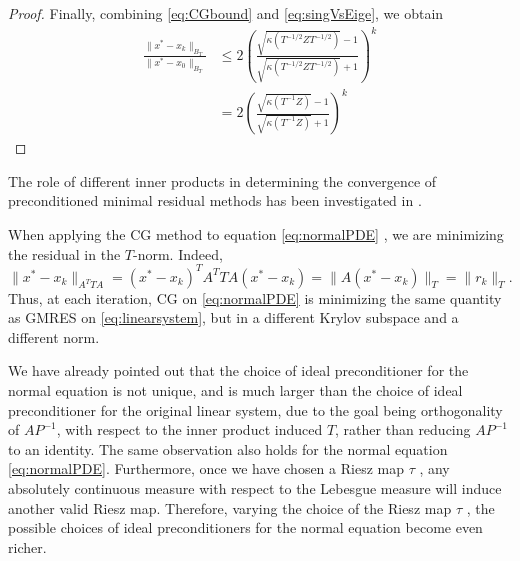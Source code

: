 \documentclass[hidelinks,onefignum,onetabnum]{siamart220329}
\newcommand{\bb}[1]{#1}
\let\vec\mathbf
\begin{document}
\begin{proof}
    Finally, combining \eqref{eq:CGbound} and \eqref{eq:singVsEige}, we obtain
    \begin{equation}
        \begin{aligned}
            \frac{\|x^* - x_k \|_{B_T}}{\|x^* - x_0 \|_{B_T}} & \leq 2\left( \frac{\sqrt{\kappa(T^{-1/2}ZT^{-1/2})} -1}{\sqrt{\kappa(T^{-1/2}ZT^{-1/2})} +1} \right)^k \\
                                                              & = 2\left( \frac{\sqrt{\kappa(T^{-1}Z)} -1}{\sqrt{\kappa(T^{-1}Z)} +1} \right)^k
        \end{aligned}
    \end{equation}
\end{proof}
The role of different inner products in determining the convergence of preconditioned minimal residual methods has been investigated in \cite{PestanaWathen}.
\begin{remark}
    When applying the CG method to equation \eqref{eq:normalPDE} , we are minimizing the residual in the $T$-norm. Indeed,
    \begin{equation}
        \|x^* -x_k\|_{A^TTA} = (x^*-x_k)^TA^T T A(x^* - x_k) = \|A(x^* - x_k)\|_T = \|r_k\|_T.
    \end{equation}
    Thus, at each iteration, CG on \eqref{eq:normalPDE} is minimizing the same quantity as GMRES on \eqref{eq:linearsystem}, but in a different Krylov subspace and a different norm.
\end{remark}
\begin{remark}
    We have already pointed out that the choice of ideal preconditioner for the normal equation is not unique, and is much larger than the choice of ideal preconditioner for the original linear system, due to the goal being orthogonality of $AP^{-1}$, with respect to the inner product induced  $T$, rather than reducing $AP^{-1}$ to an identity.
    The same observation also holds for the normal equation \eqref{eq:normalPDE}. Furthermore, once we have chosen a Riesz map $\tau$ , any absolutely continuous measure with respect to the Lebesgue measure will induce another valid Riesz map.
    Therefore, varying the choice of the Riesz map $\tau$ , the possible choices of ideal preconditioners for the normal equation become even richer.
\end{remark}
\end{document}
